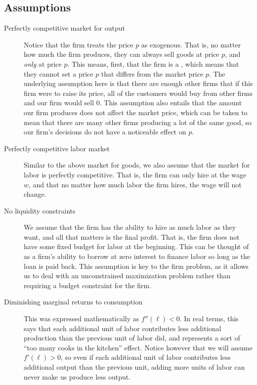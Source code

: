 \subsection{Assumptions}
\begin{description}
    \item[Perfectly competitive market for output] Notice that the firm treats the price $p$ as exogenous. That is, no matter how much the firm produces, they can always sell goods at price $p$, and \emph{only} at price $p$. This means, first, that the firm is a , which means that they cannot set a price $p$ that differs from the market price $p$. The underlying assumption here is that there are enough other firms that if this firm were to raise its price, all of the customers would buy from other firms and our firm would sell 0. This assumption also entails that the amount our firm produces does not affect the market price, which can be taken to mean that there are many other firms producing a lot of the same good, so our firm's decisions do not have a noticeable effect on $p$. 
    \item[Perfectly competitive labor market] Similar to the above market for goods, we also assume that the market for labor is perfectly competitive. That is, the firm can only hire at the wage $w$, and that no matter how much labor the firm hires, the wage will not change. 
    \item[No liquidity constraints] We assume that the firm has the ability to hire as much labor as they want, and all that matters is the final profit. That is, the firm does not have some fixed budget for labor at the beginning. This can be thought of as a firm's ability to borrow at zero interest to finance labor so long as the loan is paid back. This assumption is key to the firm problem, as it allows us to deal with an unconstrained maximization problem rather than requiring a budget constraint for the firm. 
    \item[Diminishing marginal returns to consumption] This was expressed mathematically as $f''(\ell) < 0$. In real terms, this says that each additional unit of labor contributes less additional production than the previous unit of labor did, and represents a sort of ``too many cooks in the kitchen'' effect. Notice however that we will assume $f'(\ell) > 0$, so even if each additional unit of labor contributes less additional output than the previous unit, adding more units of labor can never make us produce less output. 
\end{description}


